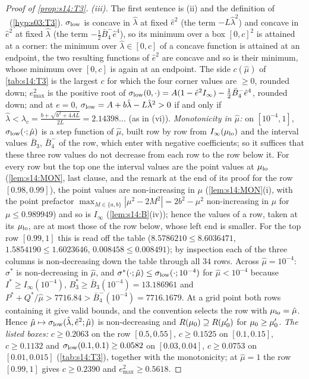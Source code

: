 \begin{proof}[Proof of \cref{prop:s14:T3}]
\emph{(iii).} The first sentence is (ii) and the definition of \Tthree\ (\cref{hyp:s03:T3}). $\sigma_{\rm low}$ is concave in $\hat\lambda$ at fixed $\hat e^2$ (the term $-L\hat\lambda^2$) and concave in $\hat e^2$ at fixed $\hat\lambda$ (the term $-\frac12\bar B_4^-\hat e^4$), so its minimum over a box $[0,c]^2$ is attained at a corner: the minimum over $\hat\lambda\in[0,c]$ of a concave function is attained at an endpoint, the two resulting functions of $\hat e^2$ are concave and so is their minimum, whose minimum over $[0,c]$ is again at an endpoint. The side $c(\hat\mu)$ of \cref{tab:s14:T3} is the largest $c$ for which the four corner values are $\ge0$, rounded down; $e^2_{\max}$ is the positive root of $\sigma_{\rm low}(0,\cdot)=A(1-\hat e^2I_\infty)-\frac12\bar B_4^-\hat e^4$, rounded down; and at $e=0$, $\sigma_{\rm low}=A+b\hat\lambda-L\hat\lambda^2>0$ if and only if $\hat\lambda<\lambda_c=\frac{b+\sqrt{b^2+4AL}}{2L}=2.14398\ldots$ (as in (vi)). \emph{Monotonicity in $\hat\mu$:} on $[10^{-4},1]$, $\sigma_{\rm low}(\cdot;\hat\mu)$ is a step function of $\hat\mu$, built row by row from $I_\infty(\mu_{\rm lo})$ and the interval values $\bar B_3$, $\bar B_4^-$ of the row, which enter with negative coefficients; so it suffices that these three row values do not decrease from each row to the row below it. For every row but the top one the interval values are the point values at $\mu_{\rm lo}$ (\cref{lem:s14:MON}, last clause, and the remark at the end of its proof for the row $[0.98,0.99]$), the point values are non-increasing in $\mu$ (\cref{lem:s14:MON}(i), with the point prefactor $\max_{M\in\{a,b\}}|\mu^2-2M^2|=2b^2-\mu^2$ non-increasing in $\mu$ for $\mu\le0.989949$) and so is $I_\infty$ (\cref{lem:s14:B}(iv)); hence the values of a row, taken at its $\mu_{\rm lo}$, are at most those of the row below, whose left end is smaller. For the top row $[0.99,1]$ this is read off the table ($8.5786210\le8.6036471$, $1.5854190\le1.6023646$, $0.008458\le0.008491$); by inspection each of the three columns is non-decreasing down the table through all $34$ rows. Across $\hat\mu=10^{-4}$: $\sigma^*$ is non-decreasing in $\hat\mu$, and $\sigma^*(\cdot;\hat\mu)\le\sigma_{\rm low}(\cdot;10^{-4})$ for $\hat\mu<10^{-4}$ because $I^*\ge I_\infty(10^{-4})$, $B_3^*\ge\bar B_3(10^{-4})=13.186961$ and $P^*+Q^*/\hat\mu>7716.84>\bar B_4^-(10^{-4})=7716.1679$. At a grid point both rows containing it give valid bounds, and the convention selects the row with $\mu_{\rm lo}=\hat\mu$. Hence $\hat\mu\mapsto\sigma_{\rm low}(\hat\lambda,\hat e^2;\hat\mu)$ is non-decreasing and $R(\mu_0)\supseteq R(\mu_0')$ for $\mu_0\ge\mu_0'$. \emph{The listed boxes:} $c\ge0.2063$ on the row $[0.5,0.55]$, $c\ge0.1525$ on $[0.1,0.15]$, $c\ge0.1132$ and $\sigma_{\rm low}(0.1,0.1)\ge0.0582$ on $[0.03,0.04]$, $c\ge0.0753$ on $[0.01,0.015]$ (\cref{tab:s14:T3}), together with the monotonicity; at $\hat\mu=1$ the row $[0.99,1]$ gives $c\ge0.2390$ and $e^2_{\max}\ge0.5618$.


\end{proof}
